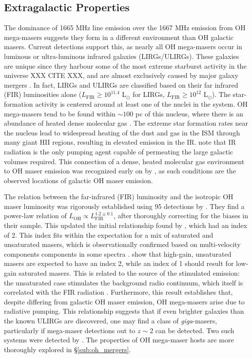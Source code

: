 \subsection{Extragalactic Properties}
\label{sub:oh_gal_props}

The dominance of 1665 MHz line emission over the 1667 MHz emission from OH mega-masers suggests they form in a different environment than OH galactic masers. Current detections support this, as nearly all OH mega-masers occur in luminous or ultra-luminous infrared galaxies (LIRGs/ULIRGs). These galaxies are unique since they harbour some of the most extreme starburst activity in the universe XXX CITE XXX, and are almost exclusively caused by major galaxy mergers \citep{clements1996}. In fact, LIRGs and ULIRGs are classified based on their far infrared (FIR) luminosities alone ($L_{\mathrm{FIR}} \ge 10^{11.4}$ L$_{\odot}$ for LIRGs, $L_{\mathrm{FIR}} \ge 10^{12}$ L$_{\odot}$).  The star-formation activity is centered around at least one of the nuclei in the system. OH mega-masers tend to be found within $\sim 100$ pc of this nucleus, where there is an abundance of heated dense molecular gas \citep{lo2005}. The extreme star formation rates near the nucleus lead to widespread heating of the dust and gas in the ISM through many giant HII regions, resulting in elevated emission in the IR. \citet{Elitzur_1992} note that IR radiation is the only pumping agent capable of permeating the large galactic volumes required. This connection of a dense, heated molecular gas environment to OH maser emission was recognized early on by \citet{Bottinelli_1987}, as such conditions are the observed locations of galactic OH maser emission. 

The relation between the far-infrared (FIR) luminosity and the isotropic OH maser luminosity was rigorously established using 95 detections by \citet{darling2002_paperIII}. They find a power-law relation of $L_{\mathrm{OH}} \propto L_{\mathrm{FIR}}^{1.2\pm0.1}$, after thoroughly correcting for the biases in their sample. This updated the initial relationship found by \cite{Baan_1989}, which had an index of 2.  This index fits within the expectation for a mix of saturated and unsaturated masers, which is observationally confirmed based on multi-velocity components components in some spectra . \citet{darling2002_paperIII} show that high-gain, unsaturated masers are expected to have an index 2, while an index of 1 should result for low-gain saturated masers. This is related to the source of the stimulated emission: the unsaturated case stimulates the background radio continuum, which itself is correlated with the FIR radiation \citep{Yun_2001}. Furthermore, this result establishes that, despite differing from galactic OH maser emission, OH mega-masers arise due to radiative pumping. This relationship suggests that if even brighter galaxies than the known ULIRGs are discovered, one may find a class of {\it giga}-masers, particularly if mega-maser detections out to $z\sim 2$ can be detected.  Two such systems were detected by \citet{darling2002_paperIII}.  The properties of OH mega-maser hosts are more thoroughly explored in \S\ref{sub:oh_mergers}.

